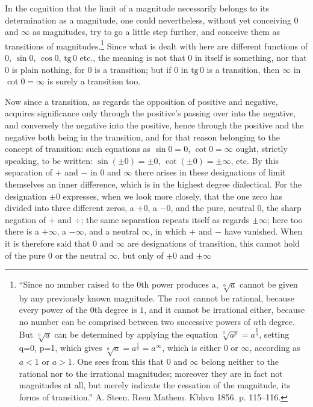 \documentclass[12pt,a4paper,openany]{book}
\newcommand{\opage}[1]{\marginnote{\footnotesize\textit{[#1]}}}
\begin{document}
In the cognition that the limit of a magnitude necessarily belongs to its determination as a magnitude, one could nevertheless, without yet conceiving $0$ and $\infty$ as magnitudes, try to go a little step further, and conceive them as transitions of magnitudes.\footnote[1]{``Since no number raised to the 0th power produces a, $\sqrt[0]{a}$ cannot be given by any previously known magnitude. The root cannot be rational, because every power of the $0$th degree is $1$, and it cannot be irrational either, because no number can be comprised between two successive powers of $n$th degree. But $\sqrt[0]{a}$ can be determined by applying the equation $\sqrt[q]{a^{p}}=a^{\frac{p}{q}}$, setting q=0, p=1, which gives $\sqrt[0]{a}=a^{\frac{1}{0}}=a^{\infty}$, which is either $0$ or $\infty$, according as $a<1$ or $a>1$. One sees from this that $0$ and $\infty$ belong neither to the rational nor to the irrational magnitudes; moreover they are in fact not magnitudes at all, but merely indicate the cessation of the magnitude, its forms of transition.'' A. Steen. Reen Mathem. Kbhvn 1856. p. 115--116.} Since what is dealt with here are different functions of $0$, $\sin 0$, $\cos 0$, $\mathrm{tg}\,0$ etc., the meaning is not that $0$ in itself is something, nor that $0$ is plain nothing, for $0$ is a transition; but if $0$ in $\mathrm{tg}\,0$ is a transition, then $\infty$ in $\cot 0=\infty$ is surely a transition too.

\setcounter{footnote}{0}%
\opage{72}Now since a transition, as regards the opposition of positive and negative, acquires significance only through the positive's passing over into the negative, and conversely the negative into the positive, hence through the positive and the negative both being in the transition, and for that reason belonging to the concept of transition: such equations as $\sin 0=0$, $\cot 0=\infty$ ought, strictly speaking, to be written: $\sin(\pm 0)=\pm 0$, $\cot(\pm 0)=\pm\infty$, etc. By this separation of $+$ and $-$ in $0$ and $\infty$ there arises in these designations of limit themselves an inner difference, which is in the highest degree dialectical. For the designation $\pm 0$ expresses, when we look more closely, that the one zero has divided into three different zeros, a $+0$, a $-0$, and the pure, neutral $0$, the sharp negation of $+$ and $\div$; the same separation repeats itself as regards $\pm\infty$; here too there is a $+\infty$, a $-\infty$, and a neutral $\infty$, in which $+$ and $-$ have vanished. When it is therefore said that $0$ and $\infty$ are designations of transition, this cannot hold of the pure $0$ or the neutral $\infty$, but only of $\pm 0$ and $\pm\infty$
\end{document}
